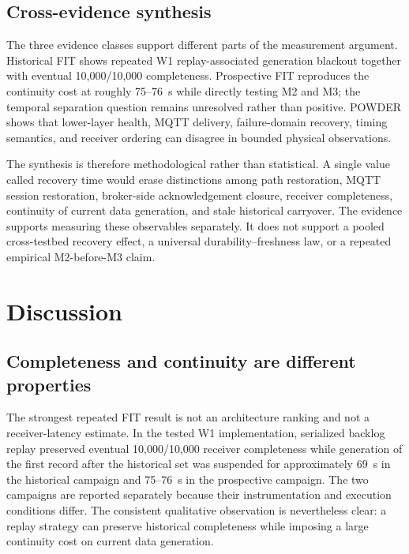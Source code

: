 \documentclass[journal]{IEEEtran}
\begin{document}
\subsection{Cross-evidence synthesis}

The three evidence classes support different parts of the measurement argument. Historical FIT shows repeated W1 replay-associated generation blackout together with eventual 10,000/10,000 completeness. Prospective FIT reproduces the continuity cost at roughly 75--76~s while directly testing M2 and M3; the temporal separation question remains unresolved rather than positive. POWDER shows that lower-layer health, MQTT delivery, failure-domain recovery, timing semantics, and receiver ordering can disagree in bounded physical observations.

The synthesis is therefore methodological rather than statistical. A single value called recovery time would erase distinctions among path restoration, MQTT session restoration, broker-side acknowledgement closure, receiver completeness, continuity of current data generation, and stale historical carryover. The evidence supports measuring these observables separately. It does not support a pooled cross-testbed recovery effect, a universal durability--freshness law, or a repeated empirical M2-before-M3 claim.

\section{Discussion}
\label{sec:discussion}

\subsection{Completeness and continuity are different properties}

The strongest repeated FIT result is not an architecture ranking and not a receiver-latency estimate. In the tested W1 implementation, serialized backlog replay preserved eventual 10,000/10,000 receiver completeness while generation of the first record after the historical set was suspended for approximately 69~s in the historical campaign and 75--76~s in the prospective campaign. The two campaigns are reported separately because their instrumentation and execution conditions differ. The consistent qualitative observation is nevertheless clear: a replay strategy can preserve historical completeness while imposing a large continuity cost on current data generation.
\end{document}

